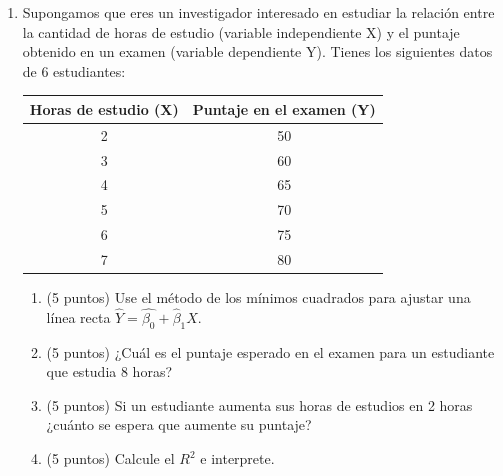 \documentclass[10pt,a4paper]{article}
\begin{document}
\begin{enumerate}

\item  Supongamos que eres un investigador interesado en estudiar la relación entre la cantidad de horas de estudio (variable independiente X) y el puntaje obtenido en un examen (variable dependiente Y).
Tienes los siguientes datos de 6 estudiantes:

\begin{table}[h!]
\centering
\begin{tabular}{|c|c|}
\hline
\textbf{Horas de estudio (X)} & \textbf{Puntaje en el examen (Y)} \\
\hline
2 & 50 \\
3 & 60 \\
4 & 65 \\
5 & 70 \\
6 & 75 \\
7 & 80 \\
\hline
\end{tabular}
\label{tabla:estudio_puntaje}
\end{table}

\begin{enumerate}
    \item  (5 puntos) Use el método de los mínimos cuadrados para ajustar una línea recta $\hat{Y}=\hat{\beta_0}+\hat{\beta}_1X$.
   \item (5 puntos) ¿Cu\'al es el puntaje esperado en el examen para un estudiante que estudia 8 horas?
\item (5 puntos) Si un estudiante aumenta sus horas de estudios en 2 horas ¿cu\'anto se espera que aumente su puntaje?
\item (5 puntos) Calcule el $R^2$ e interprete.
\end{enumerate} 

\end{enumerate}

    
\end{document}
